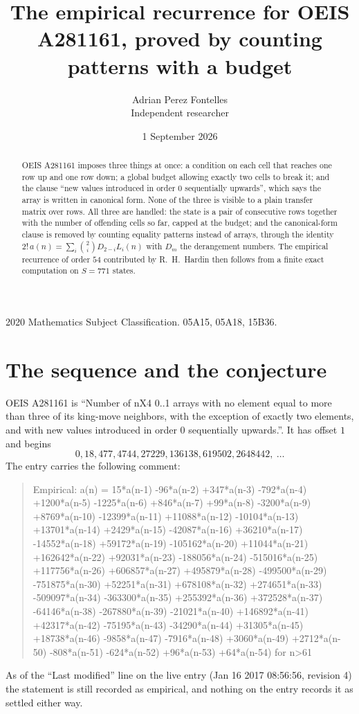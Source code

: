 \documentclass[11pt,a4paper]{article}
\title{The empirical recurrence for OEIS A281161, proved by counting patterns with a budget}
\author{Adrian Perez Fontelles\\ \small Independent researcher}
\date{1 September 2026}
\theoremstyle{plain}
\theoremstyle{definition}
\begin{document}
\maketitle

\begin{abstract}
OEIS A281161 imposes three things at once: a condition on each cell that reaches one row up and
one row down; a global budget allowing exactly two cells to
break it; and the clause ``new values introduced in order $0$ sequentially upwards'', which
says the array is written in canonical form. None of the three is visible to a plain transfer
matrix over rows. All three are handled: the state is a pair of consecutive rows
together with the number of offending cells so far, capped at the budget; and the
canonical-form clause is removed by counting equality patterns instead of arrays, through the
identity $2!\,a(n)=\sum_i\binom{2}{i}D_{2-i}L_i(n)$ with $D_m$ the derangement
numbers. The empirical recurrence of order $54$ contributed by R.~H.~Hardin then follows
from a finite exact computation on $S=771$ states.
\end{abstract}

\noindent\small 2020 Mathematics Subject Classification. 05A15, 05A18, 15B36.\normalsize

\section{The sequence and the conjecture}

OEIS A281161 is ``Number of nX4 0..1 arrays with no element equal to more than three of its king-move neighbors, with the exception of exactly two elements, and with new values introduced in order 0 sequentially upwards.''. It has offset $1$ and begins
\[
0, 18, 477, 4744, 27229, 136138, 619502, 2648442,\ \dots
\]
The entry carries the following comment:
\begin{quote}\small
Empirical: a(n) = 15*a(n-1) -96*a(n-2) +347*a(n-3) -792*a(n-4) +1200*a(n-5) -1225*a(n-6) +846*a(n-7) +99*a(n-8) -3200*a(n-9) +8769*a(n-10) -12399*a(n-11) +11088*a(n-12) -10104*a(n-13) +13701*a(n-14) +2429*a(n-15) -42087*a(n-16) +36210*a(n-17) -14552*a(n-18) +59172*a(n-19) -105162*a(n-20) +11044*a(n-21) +162642*a(n-22) +92031*a(n-23) -188056*a(n-24) -515016*a(n-25) +117756*a(n-26) +606857*a(n-27) +495879*a(n-28) -499500*a(n-29) -751875*a(n-30) +52251*a(n-31) +678108*a(n-32) +274651*a(n-33) -509097*a(n-34) -363300*a(n-35) +255392*a(n-36) +372528*a(n-37) -64146*a(n-38) -267880*a(n-39) -21021*a(n-40) +146892*a(n-41) +42317*a(n-42) -75195*a(n-43) -34290*a(n-44) +31305*a(n-45) +18738*a(n-46) -9858*a(n-47) -7916*a(n-48) +3060*a(n-49) +2712*a(n-50) -808*a(n-51) -624*a(n-52) +96*a(n-53) +64*a(n-54) for n>61
\end{quote}
As of the ``Last modified'' line on the live entry (Jan 16 2017 08:56:56, revision 4) the statement is
still recorded as empirical, and nothing on the entry records it as settled either way.
\end{document}

